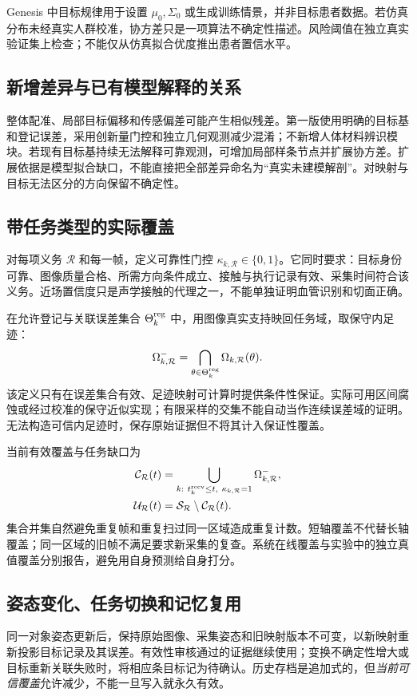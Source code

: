 \documentclass[UTF8,11pt,a4paper,fontset=fandol]{ctexart}
\numberwithin{equation}{section}
\theoremstyle{definition}
\begin{document}
Genesis 中目标规律用于设置 $\mu_0,\Sigma_0$ 或生成训练情景，并非目标患者数据。若仿真分布未经真实人群校准，协方差只是一项算法不确定性描述。风险阈值在独立真实验证集上检查；不能仅从仿真拟合优度推出患者置信水平。

\subsection{新增差异与已有模型解释的关系}
整体配准、局部目标偏移和传感偏差可能产生相似残差。第一版使用明确的目标基和登记误差，采用创新量门控和独立几何观测减少混淆；不新增人体材料辨识模块。若现有目标基持续无法解释可靠观测，可增加局部样条节点并扩展协方差。扩展依据是模型拟合缺口，不能直接把全部差异命名为“真实未建模解剖”。对映射与目标无法区分的方向保留不确定性。

\subsection{带任务类型的实际覆盖}
对每项义务 $\mathcal R$ 和每一帧，定义可靠性门控 $\kappa_{k,\mathcal R}\in\{0,1\}$。它同时要求：目标身份可靠、图像质量合格、所需方向条件成立、接触与执行记录有效、采集时间符合该义务。近场置信度只是声学接触的代理之一，不能单独证明血管识别和切面正确。

在允许登记与关联误差集合 $\Theta_k^{\rm reg}$ 中，用图像真实支持映回任务域，取保守内足迹：
\begin{equation}
\Omega^-_{k,\mathcal R}
=
\bigcap_{\theta\in\Theta_k^{\rm reg}}
\Omega_{k,\mathcal R}(\theta).
\label{eq:footprint}
\end{equation}
该定义只有在误差集合有效、足迹映射可计算时提供条件性保证。实际可用区间腐蚀或经过校准的保守近似实现；有限采样的交集不能自动当作连续误差域的证明。无法构造可信内足迹时，保存原始证据但不将其计入保证性覆盖。

当前有效覆盖与任务缺口为
\begin{align}
\mathcal C_{\mathcal R}(t)
&=\bigcup_{k:\ t_k^{\rm recv}\le t,\ \kappa_{k,\mathcal R}=1}
\Omega^-_{k,\mathcal R},\\
\mathcal U_{\mathcal R}(t)&=\mathcal S_{\mathcal R}\setminus\mathcal C_{\mathcal R}(t).
\label{eq:coverage}
\end{align}
集合并集自然避免重复帧和重复扫过同一区域造成重复计数。短轴覆盖不代替长轴覆盖；同一区域的旧帧不满足要求新采集的复查。系统在线覆盖与实验中的独立真值覆盖分别报告，避免用自身预测给自身打分。

\subsection{姿态变化、任务切换和记忆复用}
同一对象姿态更新后，保持原始图像、采集姿态和旧映射版本不可变，以新映射重新投影目标记录及其误差。有效性审核通过的证据继续使用；变换不确定性增大或目标重新关联失败时，将相应条目标记为待确认。历史存档是追加式的，但\emph{当前可信覆盖}允许减少，不能一旦写入就永久有效。
\end{document}
